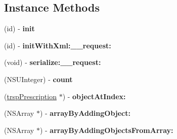 \subsection*{Instance Methods}
\begin{DoxyCompactItemize}
\item 
\hypertarget{interfaceget_prescriptions_for_patient_response_a3df80e16d25d8187ddae00d4e26b1d2d}{}(id) -\/ {\bfseries init}\label{interfaceget_prescriptions_for_patient_response_a3df80e16d25d8187ddae00d4e26b1d2d}

\item 
\hypertarget{interfaceget_prescriptions_for_patient_response_ad397e720bed9a86ce572c11c4c316026}{}(id) -\/ {\bfseries init\+With\+Xml\+:\+\_\+\+\_\+request\+:}\label{interfaceget_prescriptions_for_patient_response_ad397e720bed9a86ce572c11c4c316026}

\item 
\hypertarget{interfaceget_prescriptions_for_patient_response_a812a5fbbe68019dc39b5c04c68aee2b0}{}(void) -\/ {\bfseries serialize\+:\+\_\+\+\_\+request\+:}\label{interfaceget_prescriptions_for_patient_response_a812a5fbbe68019dc39b5c04c68aee2b0}

\item 
\hypertarget{interfaceget_prescriptions_for_patient_response_a8eb7b00911188eb112ef9ace063f447a}{}(N\+S\+U\+Integer) -\/ {\bfseries count}\label{interfaceget_prescriptions_for_patient_response_a8eb7b00911188eb112ef9ace063f447a}

\item 
\hypertarget{interfaceget_prescriptions_for_patient_response_ab5a2b9e9705d45c59176a85fc79d6114}{}(\hyperlink{interfacetrsp_prescription}{trsp\+Prescription} $\ast$) -\/ {\bfseries object\+At\+Index\+:}\label{interfaceget_prescriptions_for_patient_response_ab5a2b9e9705d45c59176a85fc79d6114}

\item 
\hypertarget{interfaceget_prescriptions_for_patient_response_a61b7df759c8e4fe89c4eadefce969951}{}(N\+S\+Array $\ast$) -\/ {\bfseries array\+By\+Adding\+Object\+:}\label{interfaceget_prescriptions_for_patient_response_a61b7df759c8e4fe89c4eadefce969951}

\item 
\hypertarget{interfaceget_prescriptions_for_patient_response_a9f07d68dd89b28b6b19e43bd805c7a7b}{}(N\+S\+Array $\ast$) -\/ {\bfseries array\+By\+Adding\+Objects\+From\+Array\+:}\label{interfaceget_prescriptions_for_patient_response_a9f07d68dd89b28b6b19e43bd805c7a7b}


\end{DoxyCompactItemize}

